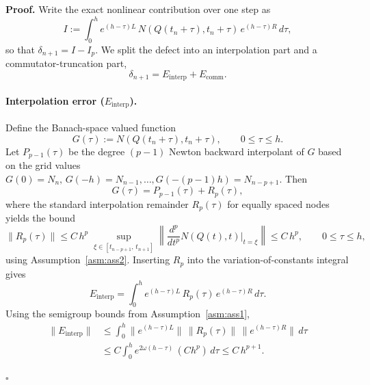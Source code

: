 \documentclass[12pt]{article}
\newenvironment{pf}{\noindent\textbf{Proof.}}{\hfill$\square$}
\begin{document}
\begin{pf}
Write the exact nonlinear contribution over one step as
\begin{equation*}
I := \int_0^h e^{(h-\tau)L}\,N(Q(t_n+\tau),t_n+\tau)\,e^{(h-\tau)R}\,d\tau,
\end{equation*}
so that $\delta_{n+1}= I - I_p$.
We split the defect into an interpolation part and a commutator-truncation part,
\begin{equation*}
\delta_{n+1} = E_{\mathrm{interp}} + E_{\mathrm{comm}}.
\end{equation*}

\paragraph{Interpolation error ($E_{\mathrm{interp}}$).}
Define the Banach-space valued function
\begin{equation}
G(\tau):=N(Q(t_n+\tau),t_n+\tau),\qquad 0\le \tau\le h.
\end{equation}
Let $P_{p-1}(\tau)$ be the degree $(p-1)$ Newton backward interpolant of $G$ based on the grid values
$G(0)=N_n,\,G(-h)=N_{n-1},\dots,G(-(p-1)h)=N_{n-p+1}$.
Then
\begin{equation}
G(\tau)=P_{p-1}(\tau)+R_p(\tau),
\end{equation}
where the standard interpolation remainder $R_p(\tau)$ for equally spaced nodes yields the bound
\begin{equation}
\|R_p(\tau)\|\le C\,h^p\;\sup_{\xi\in[t_{n-p+1},\,t_{n+1}]}\left\|\frac{d^p}{dt^p}N(Q(t),t)\Big|_{t=\xi}\right\|
\le C\,h^p,
\qquad 0\le \tau\le h,
\end{equation}
using Assumption~\ref{asm:ass2}.
Inserting $R_p$ into the variation-of-constants integral gives
\begin{equation}
E_{\mathrm{interp}}
= \int_0^h e^{(h-\tau)L}\,R_p(\tau)\,e^{(h-\tau)R}\,d\tau.
\end{equation}
Using the semigroup bounds from Assumption~\ref{asm:ass1},
\begin{align*}
\|E_{\mathrm{interp}}\|
&\le \int_0^h \|e^{(h-\tau)L}\|\,\|R_p(\tau)\|\,\|e^{(h-\tau)R}\|\,d\tau \\
&\le C \int_0^h e^{2\omega(h-\tau)}\, (C h^p)\,d\tau
\le C\,h^{p+1}.
\end{align*}


\end{pf}
\end{document}
